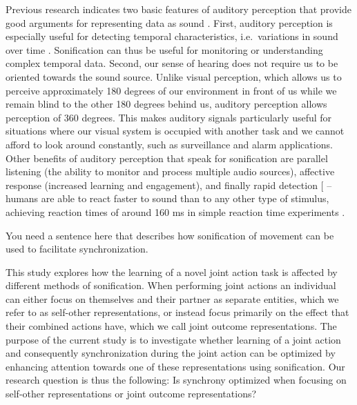 \documentclass[10pt,a4paper,onecolumn]{article}
\begin{document}
Previous research indicates two basic features of auditory perception that provide good arguments for representing data as sound \autocite{kramerSonificationReportStatus1999}. First, auditory perception is especially useful for detecting temporal characteristics, i.e.~variations in sound over time \autocite{hildebrandtShortPaperEnhancing2014}. Sonification can thus be useful for monitoring or understanding complex temporal data. Second, our sense of hearing does not require us to be oriented towards the sound source. Unlike visual perception, which allows us to perceive approximately 180 degrees of our environment in front of us while we remain blind to the other 180 degrees behind us, auditory perception allows perception of 360 degrees. This makes auditory signals particularly useful for situations where our visual system is occupied with another task and we cannot afford to look around constantly, such as surveillance and alarm applications.
Other benefits of auditory perception that speak for sonification are parallel listening (the ability to monitor and process multiple audio sources), affective response (increased learning and engagement), and finally rapid detection {[}\textcite{kramerSonificationReportStatus1999} -- humans are able to react faster to sound than to any other type of stimulus, achieving reaction times of around 160 ms in simple reaction time experiments \autocite{kosinskiLiteratureReviewReaction2008}.

You need a sentence here that describes how sonification of movement can be used to facilitate synchronization.

This study explores how the learning of a novel joint action task is affected by different methods of sonification. When performing joint actions an individual can either focus on themselves and their partner as separate entities, which we refer to as self-other representations, or instead focus primarily on the effect that their combined actions have, which we call joint outcome representations. The purpose of the current study is to investigate whether learning of a joint action and consequently synchronization during the joint action can be optimized by enhancing attention towards one of these representations using sonification. Our research question is thus the following:
Is synchrony optimized when focusing on self-other representations or joint outcome representations?
\end{document}
